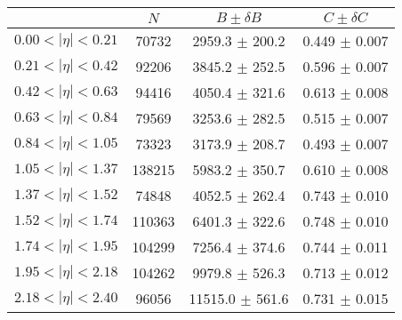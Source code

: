 \begin{tabular}{lccc}
\hline
    &   $N$   & $B \pm \delta B$  &  $C \pm \delta C$ \\
\hline
$0.00 < |\eta| <0.21$          & 70732      & 2959.3     $\pm$ 200.2 & 0.449      $\pm$ 0.007 \\
$0.21 < |\eta| <0.42$          & 92206      & 3845.2     $\pm$ 252.5 & 0.596      $\pm$ 0.007 \\
$0.42 < |\eta| <0.63$          & 94416      & 4050.4     $\pm$ 321.6 & 0.613      $\pm$ 0.008 \\
$0.63 < |\eta| <0.84$          & 79569      & 3253.6     $\pm$ 282.5 & 0.515      $\pm$ 0.007 \\
$0.84 < |\eta| <1.05$          & 73323      & 3173.9     $\pm$ 208.7 & 0.493      $\pm$ 0.007 \\
$1.05 < |\eta| <1.37$          & 138215     & 5983.2     $\pm$ 350.7 & 0.610      $\pm$ 0.008 \\
$1.37 < |\eta| <1.52$          & 74848      & 4052.5     $\pm$ 262.4 & 0.743      $\pm$ 0.010 \\
$1.52 < |\eta| <1.74$          & 110363     & 6401.3     $\pm$ 322.6 & 0.748      $\pm$ 0.010 \\
$1.74 < |\eta| <1.95$          & 104299     & 7256.4     $\pm$ 374.6 & 0.744      $\pm$ 0.011 \\
$1.95 < |\eta| <2.18$          & 104262     & 9979.8     $\pm$ 526.3 & 0.713      $\pm$ 0.012 \\
$2.18 < |\eta| <2.40$          & 96056      & 11515.0    $\pm$ 561.6 & 0.731      $\pm$ 0.015 \\
\hline
\end{tabular}
